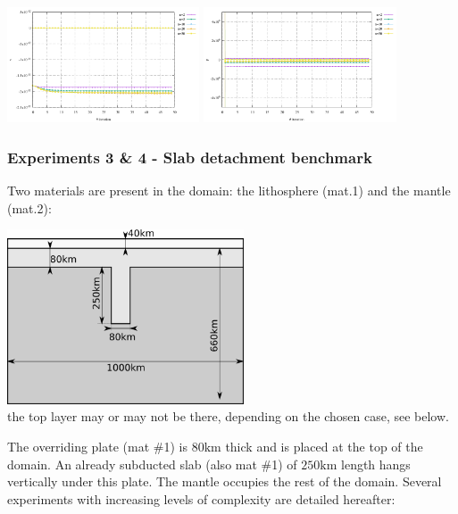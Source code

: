 \begin{center}
\includegraphics[width=5.7cm]{python_codes/fieldstone_87/results/experiment_02/v}
\includegraphics[width=5.7cm]{python_codes/fieldstone_87/results/experiment_02/p}\\
\end{center}

\newpage
\subsubsection*{Experiments 3 \& 4 - Slab detachment benchmark}

Two materials are present in the domain: the lithosphere (mat.1) and the mantle (mat.2):

\begin{center}
\includegraphics[width=7cm]{python_codes/fieldstone_87/images/drawing.png}\\
{\captionfont the top layer may or may not be there, depending on the chosen case, see below.}
\end{center}

The overriding plate (mat \#1) is $80\si{\kilo\metre}$ thick and is placed at the top of the domain. 
An already subducted slab (also mat \#1) of $250\si{\kilo\metre}$ length hangs vertically under this plate.
The mantle occupies the rest of the domain.
Several experiments with increasing levels of complexity are detailed hereafter:

